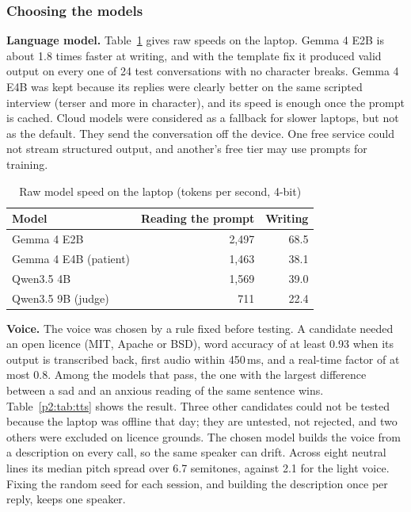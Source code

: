 \documentclass[10pt]{article}
\begin{document}
\subsubsection{Choosing the models}
\textbf{Language model.} Table~\ref{p2:tab:bench} gives raw speeds on the laptop. Gemma 4 E2B is about 1.8 times faster at writing, and with the
template fix it produced valid output on every one of 24 test conversations with no character breaks. Gemma 4 E4B was kept because its replies
were clearly better on the same scripted interview (terser and more in character), and its speed is enough once the prompt is cached. Cloud models were considered as a fallback for slower laptops, but not as the default. They send the conversation off the device. One free service could not stream structured output, and another's free tier may use prompts for training.

\begin{table}[htbp]
\caption{Raw model speed on the laptop (tokens per second, 4-bit)}
\label{p2:tab:bench}
\centering
\footnotesize
\begin{tabular}{@{}lrr@{}}
\toprule
Model & Reading the prompt & Writing\\
\midrule
Gemma 4 E2B & 2,497 & 68.5\\
Gemma 4 E4B (patient) & 1,463 & 38.1\\
Qwen3.5 4B & 1,569 & 39.0\\
Qwen3.5 9B (judge) & 711 & 22.4\\
\bottomrule
\end{tabular}
\end{table}

\textbf{Voice.} The voice was chosen by a rule fixed before testing. A candidate needed an open licence (MIT, Apache or BSD), word accuracy of at least 0.93 when its output is transcribed back, first audio within 450\,ms, and a real-time factor of at most 0.8. Among the models that pass, the one with the largest difference between a sad and an anxious reading of the same sentence wins. Table~\ref{p2:tab:tts} shows the result. Three
other candidates could not be tested because the laptop was offline that day; they are untested, not rejected, and two others were excluded on
licence grounds. The chosen model builds the voice from a description on every call, so the same speaker can drift. Across eight neutral lines its median pitch spread over 6.7 semitones, against 2.1 for the light voice. Fixing the random seed for each session, and building the description
once per reply, keeps one speaker.
\end{document}
